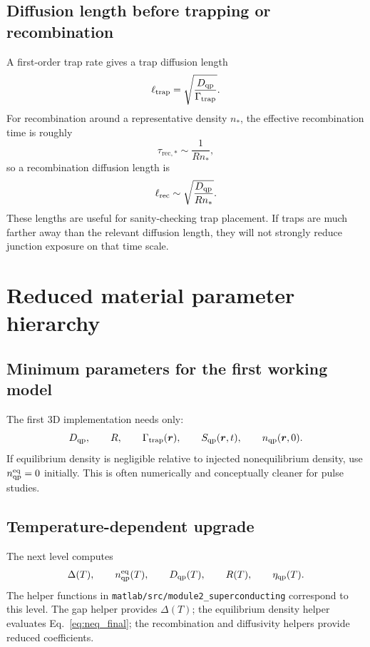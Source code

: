\documentclass[11pt]{article}
\newcommand{\br}{{\bm{r}}}
\newcommand{\trap}{\mathrm{trap}}
\newcommand{\rec}{\mathrm{rec}}
\newcommand{\eq}{\mathrm{eq}}
\begin{document}
\subsection{Diffusion length before trapping or recombination}
A first-order trap rate gives a trap diffusion length
\begin{equation}
\ell_{\trap}=\sqrt{\frac{D_{\qp}}{\Gamma_{\trap}}}.
\end{equation}
For recombination around a representative density $n_*$, the effective recombination time is roughly
\begin{equation}
\tau_{\rec,*}\sim\frac{1}{R n_*},
\end{equation}
so a recombination diffusion length is
\begin{equation}
\ell_{\rec}\sim\sqrt{\frac{D_{\qp}}{R n_*}}.
\end{equation}
These lengths are useful for sanity-checking trap placement. If traps are much farther away than the relevant diffusion length, they will not strongly reduce junction exposure on that time scale.

\section{Reduced material parameter hierarchy}

\subsection{Minimum parameters for the first working model}
The first 3D implementation needs only:
\begin{equation}
D_{\qp},\qquad R,
\qquad \Gamma_{\trap}(\br),
\qquad S_{\qp}(\br,t),
\qquad n_{\qp}(\br,0).
\end{equation}
If equilibrium density is negligible relative to injected nonequilibrium density, use $n_{\qp}^{\eq}=0$ initially. This is often numerically and conceptually cleaner for pulse studies.

\subsection{Temperature-dependent upgrade}
The next level computes
\begin{equation}
\Delta(T),\qquad n_{\qp}^{\eq}(T),\qquad D_{\qp}(T),\qquad R(T),\qquad \eta_{\qp}(T).
\end{equation}
The helper functions in \texttt{matlab/src/module2\_superconducting} correspond to this level. The gap helper provides $\Delta(T)$; the equilibrium density helper evaluates Eq.~\eqref{eq:neq_final}; the recombination and diffusivity helpers provide reduced coefficients.
\end{document}
